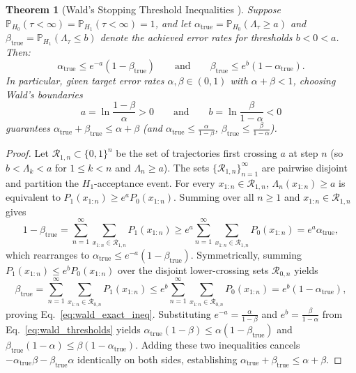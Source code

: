 \documentclass[oneside,noexaminfo,english]{sapthesis}
\numberwithin{equation}{section}
\numberwithin{figure}{section}
\numberwithin{table}{section}
\theoremstyle{compactplain}
\newtheorem{theorem}{Theorem}[section]
\theoremstyle{compactdef}
\theoremstyle{compactrem}
\newcommand{\Prob}{\mathbb{P}}
\begin{document}
\begin{theorem}[Wald's Stopping Threshold Inequalities \cite{wald1945}]
\label{thm:wald_bounds}
Suppose $\Prob_{H_0}(\tau < \infty) = \Prob_{H_1}(\tau < \infty) = 1$, and let $\alpha_{\mathrm{true}} = \Prob_{H_0}(\Lambda_\tau \ge a)$ and $\beta_{\mathrm{true}} = \Prob_{H_1}(\Lambda_\tau \le b)$ denote the achieved error rates for thresholds $b < 0 < a$. Then:
\begin{equation}
    \label{eq:wald_exact_ineq}
    \alpha_{\mathrm{true}} \le e^{-a}(1 - \beta_{\mathrm{true}}) \qquad \text{and} \qquad \beta_{\mathrm{true}} \le e^{b}(1 - \alpha_{\mathrm{true}}).
\end{equation}
In particular, given target error rates $\alpha, \beta \in (0, 1)$ with $\alpha + \beta < 1$, choosing Wald's boundaries
\begin{equation}
    \label{eq:wald_thresholds}
    a = \ln\frac{1 - \beta}{\alpha} > 0 \qquad \text{and} \qquad b = \ln\frac{\beta}{1 - \alpha} < 0
\end{equation}
guarantees $\alpha_{\mathrm{true}} + \beta_{\mathrm{true}} \le \alpha + \beta$ (and $\alpha_{\mathrm{true}} \le \frac{\alpha}{1-\beta}$, $\beta_{\mathrm{true}} \le \frac{\beta}{1-\alpha}$).
\end{theorem}
\begin{proof}
Let $\mathcal{R}_{1,n} \subset \{0,1\}^n$ be the set of trajectories first crossing $a$ at step $n$ (so $b < \Lambda_k < a$ for $1 \le k < n$ and $\Lambda_n \ge a$). The sets $\{\mathcal{R}_{1,n}\}_{n=1}^\infty$ are pairwise disjoint and partition the $H_1$-acceptance event. For every $x_{1:n} \in \mathcal{R}_{1,n}$, $\Lambda_n(x_{1:n}) \ge a$ is equivalent to $P_1(x_{1:n}) \ge e^a P_0(x_{1:n})$. Summing over all $n \ge 1$ and $x_{1:n} \in \mathcal{R}_{1,n}$ gives
\begin{equation*}
    1 - \beta_{\mathrm{true}} = \sum_{n=1}^\infty \sum_{x_{1:n} \in \mathcal{R}_{1,n}} P_1(x_{1:n})
    \ge e^a \sum_{n=1}^\infty \sum_{x_{1:n} \in \mathcal{R}_{1,n}} P_0(x_{1:n}) = e^a \alpha_{\mathrm{true}},
\end{equation*}
which rearranges to $\alpha_{\mathrm{true}} \le e^{-a}(1-\beta_{\mathrm{true}})$. Symmetrically, summing $P_1(x_{1:n}) \le e^b P_0(x_{1:n})$ over the disjoint lower-crossing sets $\mathcal{R}_{0,n}$ yields
\begin{equation*}
    \beta_{\mathrm{true}} = \sum_{n=1}^\infty \sum_{x_{1:n} \in \mathcal{R}_{0,n}} P_1(x_{1:n})
    \le e^b \sum_{n=1}^\infty \sum_{x_{1:n} \in \mathcal{R}_{0,n}} P_0(x_{1:n}) = e^b(1 - \alpha_{\mathrm{true}}),
\end{equation*}
proving Eq.~\eqref{eq:wald_exact_ineq}. Substituting $e^{-a} = \frac{\alpha}{1-\beta}$ and $e^b = \frac{\beta}{1-\alpha}$ from Eq.~\eqref{eq:wald_thresholds} yields $\alpha_{\mathrm{true}}(1-\beta) \le \alpha(1-\beta_{\mathrm{true}})$ and $\beta_{\mathrm{true}}(1-\alpha) \le \beta(1-\alpha_{\mathrm{true}})$. Adding these two inequalities cancels $-\alpha_{\mathrm{true}}\beta - \beta_{\mathrm{true}}\alpha$ identically on both sides, establishing $\alpha_{\mathrm{true}} + \beta_{\mathrm{true}} \le \alpha + \beta$.
\end{proof}
\end{document}

